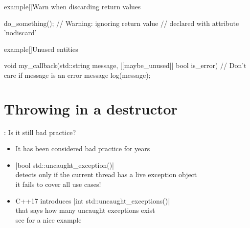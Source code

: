 \begin{frame}[fragile]{}
\begin{onlyenv}
\begin{varblock}{example}[\textwidth]{Warn when discarding return values}
\begin{Cpp}
                do_something(); // Warning: ignoring return value
                                // declared with attribute 'nodiscard'
            \end{Cpp}
        \end{varblock}
        \bigskip
        \begin{varblock}{example}[\textwidth]{Unused entities}
            \begin{Cpp}
                void my_callback(std::string message,
                                 [[maybe_unused]] bool is_error) {
                    // Don't care if message is an error message
                    log(message);
                }
            \end{Cpp}
        \end{varblock}
    \end{onlyenv}
\end{frame}

\section{Throwing in a destructor}
\begin{frame}[fragile]{\insertsectionhead: Is it still bad practice?}
    \begin{itemize}
        \item It has been considered bad practice for years\\
              \then {}
        \item \CPP|bool std::uncaught_exception()|\\
              detects only if the current thread has a live exception object\\
              \then it fails to cover all use cases! 
        \item C++17 introduces \CPP|int std::uncaught_exceptions()|\\
              that says how many uncaught exceptions exist\\
              \then see  for a nice example
    \end{itemize}
\end{frame}

